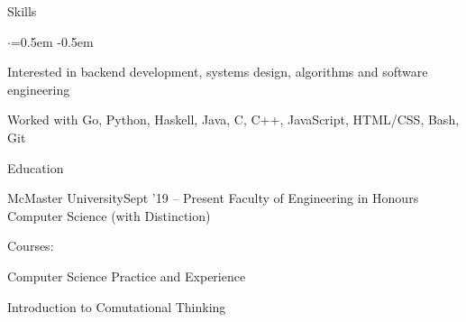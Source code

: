 \documentclass{resume} %
\begin{document}

\begin{rSection}{Skills}
  \vspace {0.2em}
  \begin{list}{$\cdot$}{\leftmargin=0.5em}
    \itemsep -0.5em \vspace{-0.3em}
    \item Interested in backend development, systems design, algorithms and
      software engineering
    \item Worked with Go, Python, Haskell, Java, C, C++, JavaScript, HTML/CSS, Bash,
      Git
  \end{list}
  \vspace{0.1em}
\end{rSection}


\begin{rSection}{Education}
  \begin{rSubsection}{McMaster University}{Sept '19 -- Present}
                     {Faculty of Engineering in Honours Computer Science (with Distinction)}{}
      \item Courses: 
      \item Computer Science Practice and Experience
      \item Introduction to Comutational Thinking
  \end{rSubsection}
\end{rSection}

\end{document}
